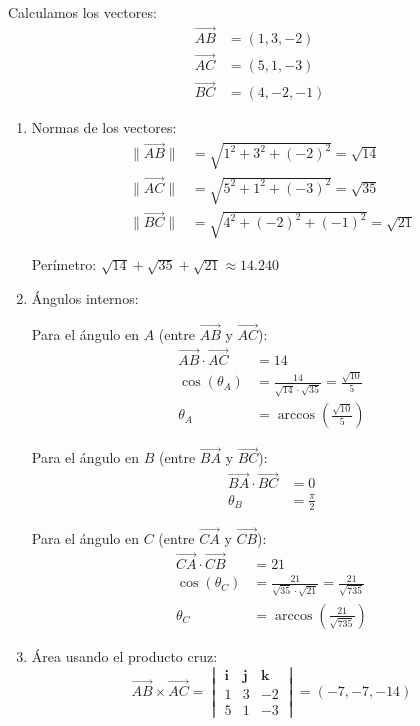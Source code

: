 \begin{prob}
\begin{myproof}
\begin{multicols}{2}
Calculamos los vectores:
\begin{align*}
\overrightarrow{AB} &= (1, 3, -2) \\
\overrightarrow{AC} &= (5, 1, -3) \\
\overrightarrow{BC} &= (4, -2, -1)
\end{align*}


\begin{enumerate}[$(a)$]
\item Normas de los vectores:
\begin{align*}
\|\overrightarrow{AB}\| &= \sqrt{1^2 + 3^2 + (-2)^2} = \sqrt{14} \\
\|\overrightarrow{AC}\| &= \sqrt{5^2 + 1^2 + (-3)^2} = \sqrt{35} \\
\|\overrightarrow{BC}\| &= \sqrt{4^2 + (-2)^2 + (-1)^2} = \sqrt{21}
\end{align*}

Perímetro: $\sqrt{14} + \sqrt{35} + \sqrt{21} \approx 14.240$

\item Ángulos internos:

Para el ángulo en $A$ (entre $\overrightarrow{AB}$ y $\overrightarrow{AC}$):
\begin{align*}
\overrightarrow{AB} \cdot \overrightarrow{AC} &=  14 \\
\cos(\theta_A) &= \frac{14}{\sqrt{14} \cdot \sqrt{35}} = \frac{\sqrt{10}}{5} \\
\theta_A &= \arccos\left(\frac{\sqrt{10}}{5}\right)
\end{align*}

Para el ángulo en $B$ (entre $\overrightarrow{BA}$ y $\overrightarrow{BC}$):
\begin{align*}
\overrightarrow{BA} \cdot \overrightarrow{BC} &= 0 \\
\theta_B &= \frac{\pi}{2}
\end{align*}

Para el ángulo en $C$ (entre $\overrightarrow{CA}$ y $\overrightarrow{CB}$):
\begin{align*}
\overrightarrow{CA} \cdot \overrightarrow{CB} &=  21 \\
\cos(\theta_C) &= \frac{21}{\sqrt{35} \cdot \sqrt{21}} = \frac{21}{\sqrt{735}} \\
\theta_C &= \arccos\left(\frac{21}{\sqrt{735}}\right)
\end{align*}

\item Área usando el producto cruz:
$$\overrightarrow{AB} \times \overrightarrow{AC} = \begin{vmatrix}
\mathbf{i} & \mathbf{j} & \mathbf{k} \\
1 & 3 & -2 \\
5 & 1 & -3
\end{vmatrix} = (-7, -7, -14)$$


\end{enumerate}
\end{multicols}
\end{myproof}
\end{prob}
